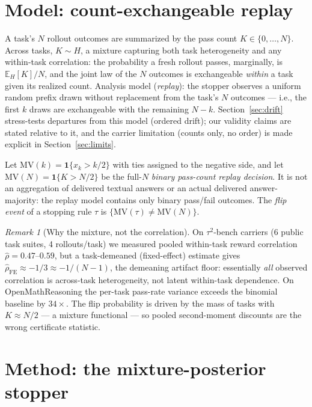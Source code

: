 \documentclass{article}
\theoremstyle{definition}
\theoremstyle{remark}
\newtheorem{remark}{Remark}
\newcommand{\MV}{\mathrm{MV}}
\newcommand{\E}{\mathbb{E}}
\begin{document}
\section{Model: count-exchangeable replay}
\label{sec:model}

A task's $N$ rollout outcomes are summarized by the pass count
$K\in\{0,\dots,N\}$. Across tasks, $K\sim H$, a mixture capturing both
task heterogeneity and any within-task correlation: the probability a fresh
rollout passes, marginally, is $\E_H[K]/N$, and the joint law of the $N$
outcomes is exchangeable \emph{within} a task given its realized count.
Analysis model (\emph{replay}): the stopper observes a uniform random
prefix drawn without replacement from the task's $N$ outcomes --- i.e., the
first $k$ draws are exchangeable with the remaining $N-k$.
Section~\ref{sec:drift} stress-tests departures from this model (ordered
drift); our validity claims are stated relative to it, and the carrier
limitation (counts only, no order) is made explicit in
Section~\ref{sec:limits}.

Let $\MV(k)=\mathbf{1}\{x_k>k/2\}$ with ties assigned to the negative side,
and let $\MV(N)=\mathbf{1}\{K>N/2\}$ be the full-$N$ \emph{binary
pass-count replay decision}.  It is not an aggregation of delivered textual
answers or an actual delivered answer-majority: the replay model contains only
binary pass/fail outcomes. The \emph{flip event} of a stopping rule $\tau$ is
$\{\MV(\tau)\neq\MV(N)\}$.

\begin{remark}[Why the mixture, not the correlation]
\label{rem:pooled}
On $\tau^2$-bench carriers (6 public task suites, 4 rollouts/task) we measured
pooled within-task reward correlation $\hat\rho=0.47$--$0.59$, but a
task-demeaned (fixed-effect) estimate gives $\hat\rho_{\mathrm{FE}}\approx-1/3
\approx-1/(N-1)$, the demeaning artifact floor: essentially \emph{all}
observed correlation is across-task heterogeneity, not latent within-task
dependence. On OpenMathReasoning the per-task pass-rate variance exceeds the
binomial baseline by $34\times$. The flip probability is driven by the mass of
tasks with $K\approx N/2$ --- a mixture functional --- so pooled
second-moment discounts are the wrong certificate statistic.
\end{remark}

\section{Method: the mixture-posterior stopper}
\label{sec:method}
\end{document}
